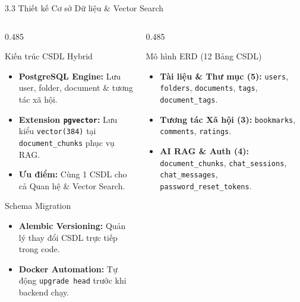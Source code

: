 \documentclass[10pt, aspectratio=169]{beamer}
\begin{document}
\begin{frame}[t]{3.3 Thiết kế Cơ sở Dữ liệu \& Vector Search}
    \footnotesize
    \begin{columns}[T,onlytextwidth]
        \begin{column}{0.485\textwidth}
            \begin{block}{Kiến trúc CSDL Hybrid}
                \begin{itemize}
                    \setlength{\itemsep}{2pt}
                    \setlength{\parskip}{0pt}
                    \item \textbf{PostgreSQL Engine:} Lưu user, folder, document \& tương tác xã hội.
                    \item \textbf{Extension \texttt{pgvector}:} Lưu kiểu \texttt{vector(384)} tại \texttt{document\_chunks} phục vụ RAG.
                    \item \textbf{Ưu điểm:} Cùng 1 CSDL cho cả Quan hệ \& Vector Search.
                \end{itemize}
            \end{block}

            \vspace{-0.05cm}
            \begin{exampleblock}{Schema Migration}
                \begin{itemize}
                    \setlength{\itemsep}{2pt}
                    \setlength{\parskip}{0pt}
                    \item \textbf{Alembic Versioning:} Quản lý thay đổi CSDL trực tiếp trong code.
                    \item \textbf{Docker Automation:} Tự động \texttt{upgrade head} trước khi backend chạy.
                \end{itemize}
            \end{exampleblock}
        \end{column}

        \hfill

        \begin{column}{0.485\textwidth}
            \begin{alertblock}{Mô hình ERD (12 Bảng CSDL)}
                \begin{itemize}
                    \setlength{\itemsep}{2pt}
                    \setlength{\parskip}{0pt}
                    \item \textbf{Tài liệu \& Thư mục (5):} \texttt{users}, \texttt{folders}, \texttt{documents}, \texttt{tags}, \texttt{document\_tags}.
                    \item \textbf{Tương tác Xã hội (3):} \texttt{bookmarks}, \texttt{comments}, \texttt{ratings}.
                    \item \textbf{AI RAG \& Auth (4):} \texttt{document\_chunks}, \texttt{chat\_sessions}, \texttt{chat\_messages}, \texttt{password\_reset\_tokens}.
                \end{itemize}
            \end{alertblock}


\end{column}
\end{columns}
\end{frame}
\end{document}
